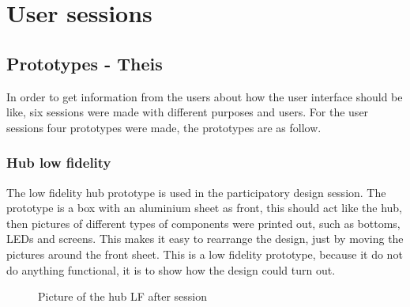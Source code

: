 \chapter{User sessions}
\section{Prototypes - Theis}
In order to get information from the users about how the user interface should be like, six sessions were made with different purposes and users. For the user sessions four prototypes were made, the prototypes are as follow.

\subsection{Hub low fidelity}
The low fidelity hub prototype is used in the participatory design session. The prototype is a box with an aluminium sheet as front, this should act like the hub, then pictures of different types of components were printed out, such as bottoms, LEDs and screens. This makes it easy to rearrange the design, just by moving the pictures around the front sheet. This is a low fidelity prototype, because it do not do anything functional, it is to show how the design could turn out.
\begin{figure}[H]
	\center
		\setlength\fboxsep{0pt}
		\setlength\fboxrule{1pt}
   	\caption{Picture of the hub LF after session}
   	\label{fig:LF hub after session}
\end{figure}

